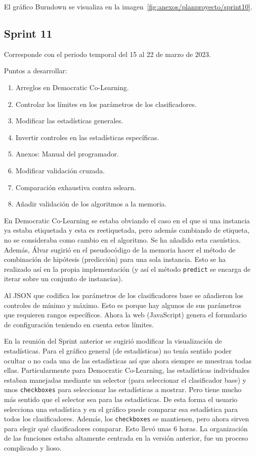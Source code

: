 El gráfico Burndown se visualiza en la imagen~\ref{fig:anexos/planproyecto/sprint10}.

\subsection{Sprint 11}
Corresponde con el periodo temporal del 15 al 22 de marzo de 2023.

Puntos a desarrollar:
\begin{enumerate}
    \item Arreglos en Democratic Co-Learning.
    \item Controlar los límites en los parámetros de los clasificadores.
    \item Modificar las estadísticas generales.
    \item Invertir controles en las estadísticas específicas.
    \item Anexos: Manual del programador.
    \item Modificar validación cruzada.
    \item Comparación exhaustiva contra sslearn.
    \item Añadir validación de los algoritmos a la memoria.
\end{enumerate}

En Democratic Co-Learning se estaba obviando el caso en el que si una instancia
ya estaba etiquetada y esta es reetiquetada, pero además cambiando de etiqueta,
no se consideraba como cambio en el algoritmo. Se ha añadido esta casuística.
Además, Álvar sugirió en el pseudocódigo de la memoria hacer el método de
combinación de hipótesis (predicción) para una sola instancia. Esto se ha
realizado así en la propia implementación (y así el método \texttt{predict} se
encarga de iterar sobre un conjunto de instancias).

Al JSON que codifica los parámetros de los clasificadores base se añadieron los
controles de mínimo y máximo. Esto es porque hay algunos de sus parámetros que
requieren rangos específicos. Ahora la web (JavaScript) genera el formulario de
configuración teniendo en cuenta estos límites.

En la reunión del Sprint anterior se sugirió modificar la visualización de
estadísticas. Para el gráfico general (de estadísticas) no tenía sentido poder
ocultar o no cada una de las estadísticas así que ahora siempre se muestran
todas ellas. Particularmente para Democratic Co-Learning, las estadísticas
individuales estaban manejadas mediante un selector (para seleccionar el
clasificador base) y unos \texttt{checkboxes} para seleccionar las estadísticas
a mostrar. Pero tiene mucho más sentido que el selector sea para las
estadísticas. De esta forma el usuario selecciona una estadística y en el
gráfico puede comparar esa estadística para todos los clasificadores. Además,
los \texttt{checkboxes} se mantienen, pero ahora sirven para elegir qué
clasificadores comparar. Esto llevó unas 6 horas. La organización de las
funciones estaba altamente centrada en la versión anterior, fue un proceso
complicado y lioso.

